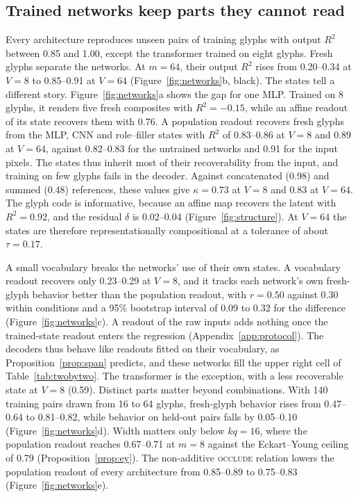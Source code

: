 \documentclass[10pt]{article}
\theoremstyle{plain}
\theoremstyle{remark}
\begin{document}
\subsection{Trained networks keep parts they cannot read}
\label{sec:networks}

Every architecture reproduces unseen pairs of training glyphs with output $R^2$ between 0.85 and 1.00, except the transformer trained on eight glyphs. Fresh glyphs separate the networks. At $m = 64$, their output $R^2$ rises from 0.20--0.34 at $V = 8$ to 0.85--0.91 at $V = 64$ (Figure~\ref{fig:networks}b, black). The states tell a different story. Figure~\ref{fig:networks}a shows the gap for one MLP. Trained on 8 glyphs, it renders five fresh composites with $R^2 = -0.15$, while an affine readout of its state recovers them with 0.76. A population readout recovers fresh glyphs from the MLP, CNN and role--filler states with $R^2$ of 0.83--0.86 at $V = 8$ and 0.89 at $V = 64$, against 0.82--0.83 for the untrained networks and 0.91 for the input pixels. The states thus inherit most of their recoverability from the input, and training on few glyphs fails in the decoder. Against concatenated (0.98) and summed (0.48) references, these values give $\kappa = 0.73$ at $V = 8$ and $0.83$ at $V = 64$. The glyph code is informative, because an affine map recovers the latent with $R^2 = 0.92$, and the residual $\delta$ is 0.02--0.04 (Figure~\ref{fig:structure}). At $V = 64$ the states are therefore representationally compositional at a tolerance of about $\tau = 0.17$.

A small vocabulary breaks the networks' use of their own states. A vocabulary readout recovers only 0.23--0.29 at $V = 8$, and it tracks each network's own fresh-glyph behavior better than the population readout, with $r = 0.50$ against $0.30$ within conditions and a 95\% bootstrap interval of 0.09 to 0.32 for the difference (Figure~\ref{fig:networks}c). A readout of the raw inputs adds nothing once the trained-state readout enters the regression (Appendix~\ref{app:protocol}). The decoders thus behave like readouts fitted on their vocabulary, as Proposition~\ref{prop:span} predicts, and these networks fill the upper right cell of Table~\ref{tab:twobytwo}. The transformer is the exception, with a less recoverable state at $V = 8$ (0.59). Distinct parts matter beyond combinations. With 140 training pairs drawn from 16 to 64 glyphs, fresh-glyph behavior rises from 0.47--0.64 to 0.81--0.82, while behavior on held-out pairs falls by 0.05--0.10 (Figure~\ref{fig:networks}d). Width matters only below $kq = 16$, where the population readout reaches 0.67--0.71 at $m = 8$ against the Eckart--Young ceiling of 0.79 (Proposition~\ref{prop:ey}). The non-additive \textsc{occlude} relation lowers the population readout of every architecture from 0.85--0.89 to 0.75--0.83 (Figure~\ref{fig:networks}e).
\end{document}
